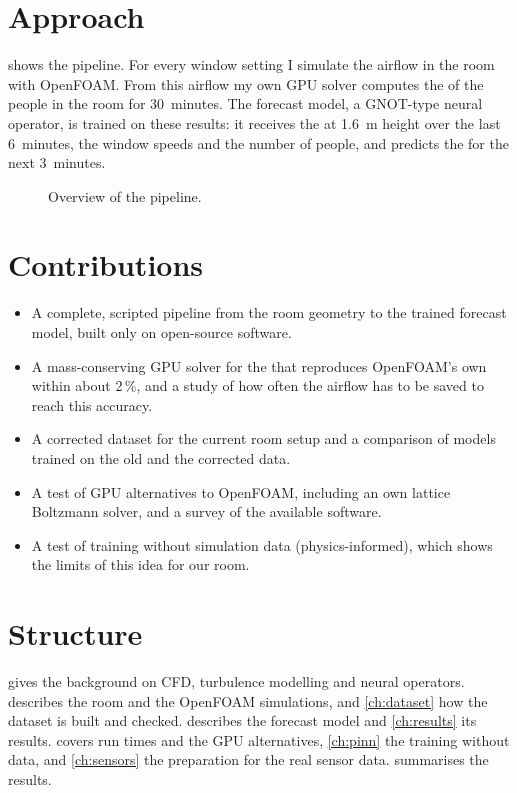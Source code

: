 \section{Approach}
 shows the pipeline. For every window setting I simulate the airflow in the room with
OpenFOAM. From this airflow my own GPU solver computes the \cotwo{} of the people in the room for
30~minutes. The forecast model, a GNOT-type neural operator, is trained on these results: it receives the
\cotwo{} at 1.6~m height over the last 6~minutes, the window speeds and the number of people, and predicts
the \cotwo{} for the next 3~minutes.

\begin{figure}[h]
  \centering
  \caption{Overview of the pipeline. }
  \label{fig:pipeline}
\end{figure}

\section{Contributions}
\begin{itemize}
  \item A complete, scripted pipeline from the room geometry to the trained forecast model, built only on
        open-source software.
  \item A mass-conserving GPU solver for the \cotwo{} that reproduces OpenFOAM's own \cotwo{} within about
        2\,\%, and a study of how often the airflow has to be saved to reach this accuracy.
  \item A corrected dataset for the current room setup and a comparison of models trained on the old and the
        corrected data.
  \item A test of GPU alternatives to OpenFOAM, including an own lattice Boltzmann solver, and a survey of
        the available software.
  \item A test of training without simulation data (physics-informed), which shows the limits of this idea
        for our room.
\end{itemize}

\section{Structure}
 gives the background on CFD, turbulence modelling and neural operators.
 describes the room and the OpenFOAM simulations, and \cref{ch:dataset} how the \cotwo{}
dataset is built and checked.  describes the forecast model and \cref{ch:results} its
results.  covers run times and the GPU alternatives, \cref{ch:pinn} the training
without data, and \cref{ch:sensors} the preparation for the real sensor data. 
summarises the results.
